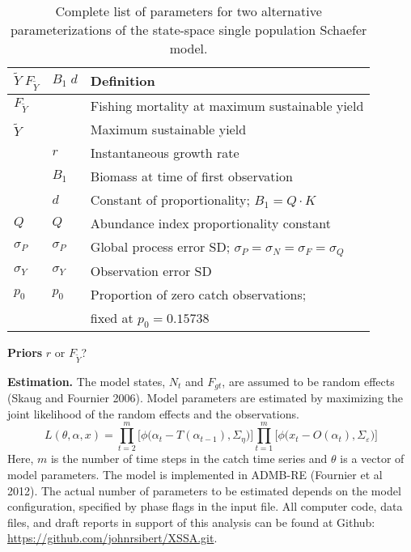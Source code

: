 \documentclass[12pt,letterpaper,twoside]{article}
\newcommand\MSY{\tilde{Y}}
\newcommand\Fmsy{F_{\MSY}}
\begin{document}
\begin{table}
\caption{Complete list of parameters for two alternative
parameterizations of the state-space single population Schaefer model.
\label{tab:allvars1}}
\begin{center}
\begin{tabular}{lll}
\hline
$\MSY\;\Fmsy$ & $B_1\;d$ & Definition\\
\hline
\hline
$\Fmsy$&  & Fishing mortality at maximum sustainable yield\\
$\MSY$ &  & Maximum sustainable yield\\
    & $r$ & Instantaneous growth rate\\
    & $B_1$ & Biomass at time of first observation\\
    &  $d $ & Constant of proportionality; $B_1=Q\cdot K$\\
$Q$ & $Q$ & Abundance index proportionality constant\\
$\sigma_P$ & $\sigma_P$ & Global process error SD; $\sigma_P=\sigma_N=\sigma_F=\sigma_Q$\\
$\sigma_Y$ & $\sigma_Y$ & Observation error SD \\
\hline
$p_0$ & $p_0$ & Proportion of zero catch observations;\\
      &        & fixed at $p_0 = 0.15738$\\
\hline
\end{tabular}
\end{center}
\end{table}

{\bf Priors} $r$ or $\Fmsy$?


{\bf Estimation.} The model states, $N_t$ and $F_{gt}$, are assumed to be random
effects (Skaug and Fournier 2006). Model parameters are estimated by
maximizing the joint likelihood of the random
effects and the observations.
\begin{equation}
L(\theta,\alpha,x)=
\prod^m_{t=2}\big[\phi\big(\alpha_t-T(\alpha_{t-1}), \Sigma_\eta\big)\big]
\prod^m_{t=1}\big[\phi\big(x_t-O(\alpha_t), \Sigma_\varepsilon\big)\big]
\end{equation}
Here, $m$ is the number of time steps in the catch time series and
$\theta$ is a vector of model parameters.
The model is implemented in ADMB-RE (Fournier et al 2012).
The actual number of
parameters to be estimated depends on the model configuration,
specified by phase flags in the input file. 
All computer code, data files, and draft reports in support of this
analysis can be found at Github:
\url{https://github.com/johnrsibert/XSSA.git}.



\clearpage

\end{document}
